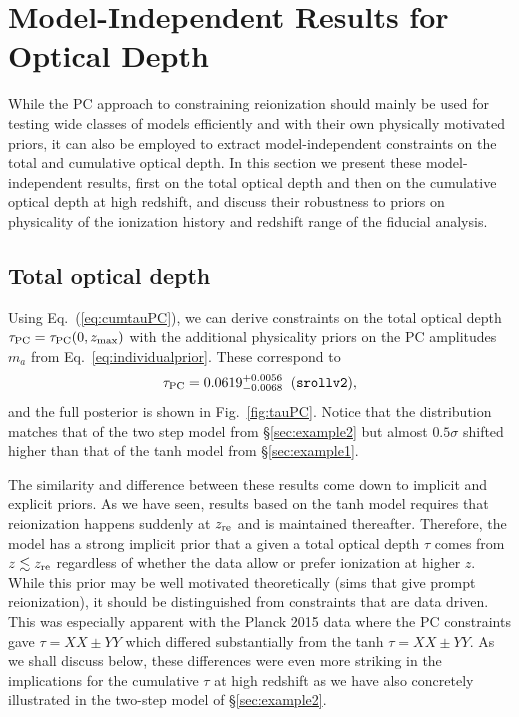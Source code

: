 \documentclass[prd,twocolumn,amsmath,amssymb,floatfix,superscriptaddress,nofootinbib]{revtex4-1}
\newcommand{\beq}{\begin{equation}}
\newcommand{\eeq}{\end{equation}}
\begin{document}
\section{Model-Independent Results for Optical Depth}
\label{sec:modelindependent}

While the PC approach to constraining reionization should mainly be used for 
testing wide classes of models efficiently and with their own physically motivated priors, it can also be employed to extract model-independent constraints on the total and cumulative optical depth. 
In this section we present these model-independent results, first on the total optical depth and then on the cumulative optical depth at high redshift, and discuss their robustness to priors  on physicality of the ionization history and redshift range of the fiducial analysis.


\subsection{Total optical depth}

\label{sec:note_on_priors}


Using Eq.~(\ref{eq:cumtauPC}), we can derive constraints on the total optical
depth $\tau_{\rm PC}=\tau_{\rm PC}(0,z_{\rm max})$ with the additional physicality priors on the PC amplitudes $m_a$ from
Eq.~\ref{eq:individualprior}.  These 
correspond to 
\beq
\tau_{\rm PC} = 0.0619^{+0.0056}_{-0.0068} \;\; (\texttt{srollv2}),
\label{eq:tau_pc_zmax30}
\eeq  
and the full posterior is shown in Fig.~\ref{fig:tauPC}. 
Notice that the distribution matches that of the two step model from \S \ref{sec:example2} but almost $0.5\sigma$ shifted higher than that of the tanh model from \S \ref{sec:example1}.  





The similarity and difference between these results come down to implicit and explicit priors. As we have seen, 
results based on the tanh model requires that reionization happens suddenly at $z_{\rm re}$ and is maintained thereafter.   Therefore, the model has a strong implicit prior that a given a total optical depth $\tau$ comes from $z\lesssim z_{\rm re}$ regardless of whether the data allow or prefer
ionization at higher $z$.  While this prior may be well motivated
theoretically \cite{XX} (sims that give prompt reionization), it should be distinguished from constraints that are data driven.  
This was especially apparent with the Planck 2015 data where
the PC constraints gave $\tau=XX\pm YY$ which differed substantially from the tanh $\tau=XX\pm YY$.  As we shall discuss
below, these differences were even more striking in the implications for the cumulative $\tau$ at high redshift as we have also concretely illustrated in the two-step model of \S \ref{sec:example2}.
\end{document}
